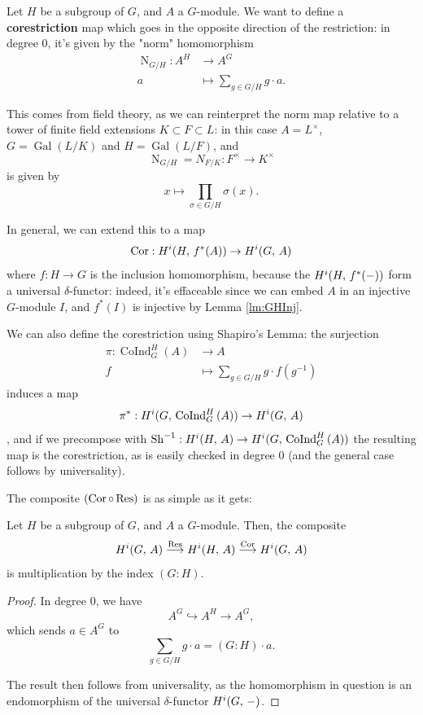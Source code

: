 \documentclass[a4paper, oneside]{memoir}
\begin{document}
Let $H$ be a subgroup of $G$, and $A$ a $G$-module. We want to define a \textbf{corestriction} map which goes in the opposite direction of the restriction: in degree $0$, it's given by the "norm" homomorphism
\begin{align*}
	\operatorname{N}_{G/H}: A^H & \longrightarrow A^G                   \\
	a                           & \longmapsto \sum_{g\in G/H} g\cdot a.
\end{align*}
\begin{remark}
	This comes from field theory, as we can reinterpret the norm map relative to a tower of finite field extensions $K\subset F\subset L$: in this case $A=L^\times$, $G=\operatorname{Gal}{(L/K)}$ and $H=\operatorname{Gal}{(L/F)}$, and $$\operatorname{N}_{G/H}=N_{F/K}: F^\times\to K^\times$$ is given by $$x\mapsto\prod_{\sigma\in G/H} \sigma(x).$$
\end{remark}

\noindent In general, we can extend this to a map
\[
	\operatorname{Cor}: H^{i}( H, \, f^*(A) )\to H^{i}( G, \, A )
\]
where $f: H\to G$ is the inclusion homomorphism, because the $H^{i}( H, \, f^*(-) )$ form a universal $\delta$-functor: indeed, it's effaceable since we can embed $A$ in an injective $G$-module $I$, and $f^*(I)$ is injective by Lemma \ref{lm:GHInj}.

\begin{remark}\label{rm:Cor}
	We can also define the corestriction using Shapiro's Lemma: the surjection
	\begin{align*}
		\pi: \operatorname{CoInd}_G^H{(A)} & \to A                                      \\
		f                                  & \mapsto \sum_{g\in G /H}{g\cdot f(g^{-1})}
	\end{align*}
	induces a map
	\[
		\pi^*:H^{i}( G, \, \operatorname{CoInd}_G^H{(A)} )\to H^{i}( G, \, A )
	\],
	and if we precompose with $\operatorname{Sh}^{-1}: H^{i}( H, \, A )\to H^{i}( G, \, \operatorname{CoInd}_G^H{(A)} )$ the resulting map is the corestriction, as is easily checked in degree $0$ (and the general case follows by universality).
\end{remark}

The composite $(\operatorname{Cor}\circ\operatorname{Res})$ is as simple as it gets:

\begin{theorem}\label{thm:CorRes}
	Let $H$ be a subgroup of $G$, and $A$ a $G$-module. Then,  the composite
	\[
		H^{i}( G, \, A )\overset{\operatorname{Res}}{\longrightarrow}H^{i}( H, \, A )\overset{\operatorname{Cor}}{\longrightarrow}H^{i}( G, \, A )
	\]
	is multiplication by the index $(G:H)$.
\end{theorem}
\begin{proof}
	In degree $0$, we have
	\[
		A^G\hookrightarrow A^H\to A^G,
	\]
	which sends $a\in A^G$ to $$\sum_{g\in G/H} g\cdot a = (G:H)\cdot a.$$

	The result then follows from universality, as the homomorphism in question is an endomorphism of the universal $\delta$-functor $H^{i}( G, \, - )$.
\end{proof}
\end{document}
